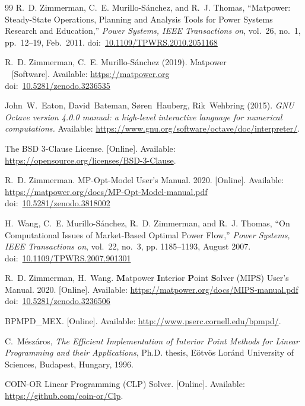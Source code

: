 \documentclass[12pt]{article}
\newcommand{\matpower}[0]{{\sc Matpower}}
\newcommand{\mips}[0]{{MIPS}}
\newcommand{\mipsname}[0]{{{\bf M}{\sc atpower} \textbf{I}nterior \textbf{P}oint \textbf{S}olver}}
\newcommand{\mpom}[0]{\mbox{MP-Opt-Model}}
\newcommand{\mpomname}[0]{\mpom{}}
\newcommand{\doi}[1]{doi:~\href{https://doi.org/#1}{#1}}
\numberwithin{equation}{section}
\numberwithin{table}{section}
\numberwithin{figure}{section}
\begin{document}
\clearpage
\begin{thebibliography}{99}
R.~D. Zimmerman, C.~E. Murillo-S{\'a}nchez, and R.~J. Thomas, ``\matpower{}: Steady-State Operations, Planning and Analysis Tools for Power Systems Research and Education,'' \emph{Power Systems, IEEE Transactions on}, vol.~26, no.~1, pp.~12--19, Feb.~2011.
\doi{10.1109/TPWRS.2010.2051168}

R.~D. Zimmerman, C.~E. Murillo-S{\'a}nchez (2019). \matpower{}\\~
[Software]. Available: \url{https://matpower.org}\\
\doi{10.5281/zenodo.3236535}

John~W.~Eaton, David~Bateman, S{\o}ren~Hauberg, Rik~Wehbring (2015). \emph{GNU Octave version 4.0.0 manual: a high-level interactive language for numerical computations.} Available: \url{https://www.gnu.org/software/octave/doc/interpreter/}.

The BSD 3-Clause License. [Online]. Available: \url{https://opensource.org/licenses/BSD-3-Clause}.

R.~D. Zimmerman. \mpomname{} User's Manual. 2020.
[Online]. Available: \url{https://matpower.org/docs/MP-Opt-Model-manual.pdf}\\
\doi{10.5281/zenodo.3818002}

H.~Wang, C.~E. Murillo-S{\'a}nchez, R.~D. Zimmerman, and R.~J. Thomas, ``On
Computational Issues of Market-Based Optimal Power Flow,'' \emph{Power
Systems, IEEE Transactions on}, vol.~22, no.~3, pp. 1185--1193, August 2007.
\doi{10.1109/TPWRS.2007.901301}

R.~D. Zimmerman, H.~Wang. \mipsname{} (\mips{}) User's Manual. 2020.
[Online]. Available: \url{https://matpower.org/docs/MIPS-manual.pdf}\\
\doi{10.5281/zenodo.3236506}

BPMPD\_MEX. [Online]. Available:
  \url{http://www.pserc.cornell.edu/bpmpd/}.

C.~M{\'e}sz{\'a}ros, \emph{The Efficient Implementation of Interior Point Methods for Linear Programming and their Applications}, Ph.D. thesis,
  E{\"o}tv{\"o}s Lor{\'a}nd University of Sciences, Budapest, Hungary, 1996.

COIN-OR Linear Programming (CLP) Solver. [Online]. Available:
  \url{https://github.com/coin-or/Clp}.


\end{thebibliography}
\end{document}
